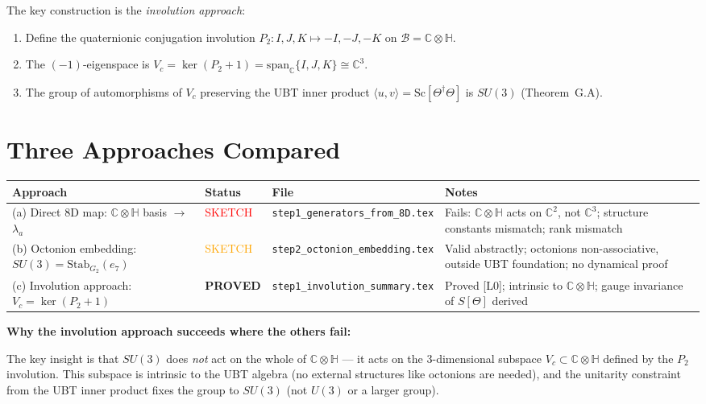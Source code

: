 \documentclass[12pt,a4paper]{article}
\theoremstyle{definition}
\theoremstyle{remark}
\begin{document}
The key construction is the \emph{involution approach}:
\begin{enumerate}
  \item Define the quaternionic conjugation involution
        $P_2\colon I,J,K \mapsto -I,-J,-K$ on $\mathcal{B} = \mathbb{C}\otimes\mathbb{H}$.
  \item The $(-1)$-eigenspace is
        $V_c = \ker(P_2+1) = \mathrm{span}_\mathbb{C}\{I,J,K\} \cong \mathbb{C}^3$.
  \item The group of automorphisms of $V_c$ preserving the UBT inner
        product $\langle u,v\rangle = \mathrm{Sc}[\Theta^\dagger\Theta]$
        is $SU(3)$ (Theorem~G.A).
\end{enumerate}

\section{Three Approaches Compared}
\label{sec:approaches}

\begin{center}
\begin{tabular}{p{3.2cm}p{1.6cm}p{2.2cm}p{5cm}}
  \toprule
  \textbf{Approach} & \textbf{Status} & \textbf{File} & \textbf{Notes} \\
  \midrule
  (a) Direct 8D map: $\mathbb{C}\otimes\mathbb{H}$ basis $\to$ $\lambda_a$
    & \textcolor{red}{SKETCH}
    & \texttt{step1\_generators\_from\_8D.tex}
    & Fails: $\mathbb{C}\otimes\mathbb{H}$ acts on $\mathbb{C}^2$,
      not $\mathbb{C}^3$; structure constants mismatch; rank mismatch \\[4pt]
  (b) Octonion embedding: $SU(3) = \mathrm{Stab}_{G_2}(e_7)$
    & \textcolor{orange}{SKETCH}
    & \texttt{step2\_octonion\_embedding.tex}
    & Valid abstractly; octonions non-associative, outside UBT foundation;
      no dynamical proof \\[4pt]
  (c) Involution approach: $V_c = \ker(P_2+1)$
    & \textcolor{green!60!black}{\textbf{PROVED}}
    & \texttt{step1\_involution\_summary.tex}
    & Proved [L0]; intrinsic to $\mathbb{C}\otimes\mathbb{H}$;
      gauge invariance of $S[\Theta]$ derived \\
  \bottomrule
\end{tabular}
\end{center}

\begin{insightbox}
\textbf{Why the involution approach succeeds where the others fail:}

The key insight is that $SU(3)$ does \emph{not} act on the whole of
$\mathbb{C}\otimes\mathbb{H}$ --- it acts on the 3-dimensional
subspace $V_c \subset \mathbb{C}\otimes\mathbb{H}$ defined by the
$P_2$ involution.  This subspace is intrinsic to the UBT algebra
(no external structures like octonions are needed), and the
unitarity constraint from the UBT inner product fixes the group
to $SU(3)$ (not $U(3)$ or a larger group).
\end{insightbox}
\end{document}
